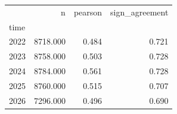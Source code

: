 \begin{tabular}{lrrr}
\toprule
 & n & pearson & sign_agreement \\
time &  &  &  \\
\midrule
2022 & 8718.000 & 0.484 & 0.721 \\
2023 & 8758.000 & 0.503 & 0.728 \\
2024 & 8784.000 & 0.561 & 0.728 \\
2025 & 8760.000 & 0.515 & 0.707 \\
2026 & 7296.000 & 0.496 & 0.690 \\
\bottomrule
\end{tabular}
